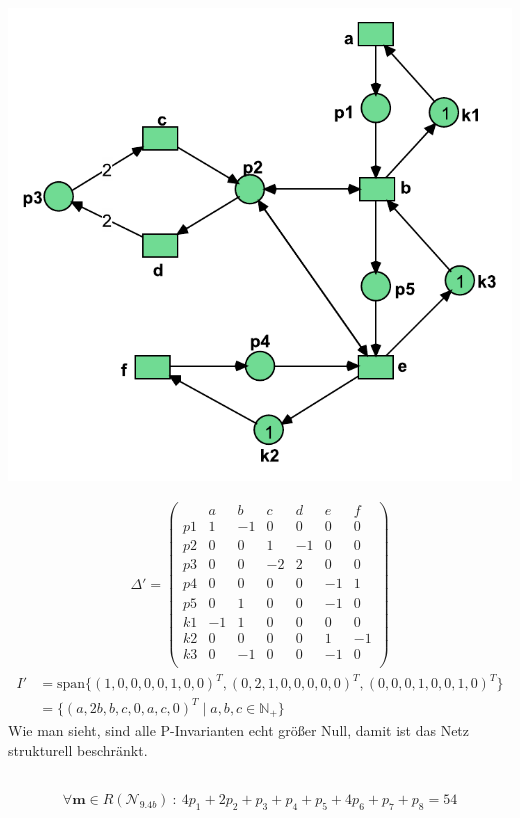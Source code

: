 \documentclass[12pt,a4paper]{../krautsourcing/homework}
\begin{document}
\centerline{
\includegraphics[scale=0.8]{aufgabe-9-5-6.pdf}
}

\begin{align*}
   \Delta' = \left( \begin{array}{c|cccccc}
       & a & b & c & d & e & f \\
       \hline
       p1 &  1 & -1 &  0 &  0 &  0 &  0 \\
       p2 &  0 &  0 &  1 & -1 &  0 &  0 \\
       p3 &  0 &  0 & -2 &  2 &  0 &  0 \\
       p4 &  0 &  0 &  0 &  0 & -1 &  1 \\
       p5 &  0 &  1 &  0 &  0 & -1 &  0 \\	
       k1 & -1 &  1 &  0 &  0 &  0 &  0 \\
       k2 &  0 &  0 &  0 &  0 &  1 & -1 \\
       k3 &  0 & -1 &  0 &  0 & -1 &  0 \\
   \end{array}\right)
\end{align*}
\begin{align*}
    I' &= \text{span}\{(1,0,0,0,0,1,0,0)^T,(0,2,1,0,0,0,0,0)^T,(0,0,0,1,0,0,1,0)^T\}
    \\ &= \{(a,2b,b,c,0,a,c,0)^T \mid a,b,c \in \mathbb{N}_+\}
\end{align*}
Wie man sieht, sind alle P-Invarianten echt größer Null, damit ist das Netz strukturell beschränkt.

\subsection{}

\begin{align*}
    \forall \mathbf{m} \in R(\mathcal{N}_{9.4b}) \ : \ 4 p_1 + 2 p_2 + p_3 + p_4 + p_5 + 4 p_6 + p_7 + p_8 = 54
\end{align*}
\end{document}
